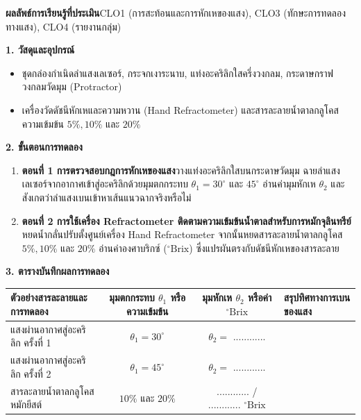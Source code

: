 \begin{labbox}
\noindent\textbf{ผลลัพธ์การเรียนรู้ที่ประเมิน}\quad CLO1 (การสะท้อนและการหักเหของแสง), CLO3 (ทักษะการทดลองทางแสง), CLO4 (รายงานกลุ่ม)

\vspace{4pt}
\noindent\textbf{1. วัสดุและอุปกรณ์}
\begin{itemize}
    \item ชุดกล่องกำเนิดลำแสงเลเซอร์, กระจกเงาระนาบ, แท่งอะคริลิกใสครึ่งวงกลม, กระดาษกราฟวงกลมวัดมุม (Protractor)
    \item เครื่องวัดดัชนีหักเหและความหวาน (Hand Refractometer) และสารละลายน้ำตาลกลูโคสความเข้มข้น $5\%, 10\%$ และ $20\%$
\end{itemize}

\noindent\textbf{2. ขั้นตอนการทดลอง}
\begin{enumerate}
    \item \textbf{ตอนที่ 1 การตรวจสอบกฎการหักเหของแสง}\quad วางแท่งอะคริลิกใสบนกระดาษวัดมุม ฉายลำแสงเลเซอร์จากอากาศเข้าสู่อะคริลิกด้วยมุมตกกระทบ $\theta_1 = 30^\circ$ และ $45^\circ$ อ่านค่ามุมหักเห $\theta_2$ และสังเกตว่าลำแสงเบนเข้าหาเส้นแนวฉากจริงหรือไม่
    \item \textbf{ตอนที่ 2 การใช้เครื่อง Refractometer ติดตามความเข้มข้นน้ำตาลสำหรับการหมักจุลินทรีย์}\quad หยดน้ำกลั่นปรับตั้งศูนย์เครื่อง Hand Refractometer จากนั้นหยดสารละลายน้ำตาลกลูโคส $5\%, 10\%$ และ $20\%$ อ่านค่าองศาบริกซ์ ($^\circ\text{Brix}$) ซึ่งแปรผันตรงกับดัชนีหักเหของสารละลาย
\end{enumerate}

\noindent\textbf{3. ตารางบันทึกผลการทดลอง}
\begin{center}
\footnotesize\setlength{\tabcolsep}{3.5pt}
\begin{tabularx}{\linewidth}{>{\raggedright\arraybackslash}X c c >{\raggedright\arraybackslash}X}
\toprule
\textbf{ตัวอย่างสารละลายและการทดลอง} & \textbf{มุมตกกระทบ $\theta_1$ หรือความเข้มข้น} & \textbf{มุมหักเห $\theta_2$ หรือค่า $^\circ\text{Brix}$} & \textbf{สรุปทิศทางการเบนของแสง} \\
\midrule
แสงผ่านอากาศสู่อะคริลิก ครั้งที่ 1 & $\theta_1 = 30^\circ$ & $\theta_2 = $ ............ & \dotfill \\
แสงผ่านอากาศสู่อะคริลิก ครั้งที่ 2 & $\theta_1 = 45^\circ$ & $\theta_2 = $ ............ & \dotfill \\
สารละลายน้ำตาลกลูโคสหมักยีสต์ & $10\%$ และ $20\%$ & ............ / ............ $^\circ\text{Brix}$ & \dotfill \\
\bottomrule
\end{tabularx}
\end{center}
\end{labbox}

